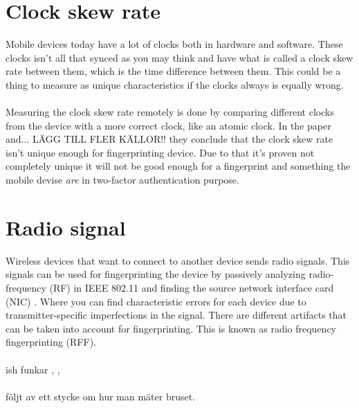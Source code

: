 \section{Clock skew rate}\label{sec:clockskew}
Mobile devices today have a lot of clocks both in hardware and software. These clocks isn't all that synced as you may think and have what is called a clock skew rate between them, which is the time difference between them. This could be a thing to measure as unique characteristics if the clocks always is equally wrong. \cite{clockSkew}\\
\\
Measuring the clock skew rate remotely is done by comparing different clocks from the device with a more correct clock, like an atomic clock.
In the paper~\cite{clockSkew} and... LÄGG TILL FLER KÄLLOR!! they conclude that the clock skew rate isn't unique enough for fingerprinting device. Due to that it's proven not completely unique it will not be good enough for a fingerprint and something the mobile devise \textit{are} in two-factor authentication purpose. 

\section{Radio signal}\label{sec:radiosignal}
Wireless devices that want to connect to another device sends radio signals. This signals can be used for fingerprinting the device by passively analyzing radio-frequency (RF) in IEEE 802.11 and finding the source network interface card (NIC) . Where you can find characteristic errors for each device due to transmitter-specific imperfections in the signal. There are different artifacts that can be taken into account for fingerprinting. This is known as radio frequency fingerprinting (RFF). \cite{rff:wifiDeviceSign}\\
\\


ish funkar \cite{rff:identWiFi} , \cite{rff:passiveDLLwifi}, \cite{rff:wifiDeviceSign}\\
\\
följt av ett stycke om hur man mäter bruset.